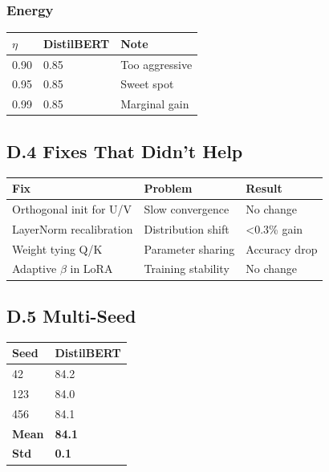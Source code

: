 \subsubsection{Energy}

\begin{table}[H]
\centering
\small
\begin{tabular}{lll}
\toprule
\textbf{$\eta$} & \textbf{DistilBERT} & \textbf{Note} \\
\midrule
0.90 & 0.85 & Too aggressive \\
0.95 & 0.85 & Sweet spot \\
0.99 & 0.85 & Marginal gain \\
\bottomrule
\end{tabular}
\end{table}

\subsection{D.4 Fixes That Didn't Help}

\begin{table}[H]
\centering
\small
\begin{tabular}{lll}
\toprule
\textbf{Fix} & \textbf{Problem} & \textbf{Result} \\
\midrule
Orthogonal init for U/V & Slow convergence & No change \\
LayerNorm recalibration & Distribution shift & \textless{}0.3\% gain \\
Weight tying Q/K & Parameter sharing & Accuracy drop \\
Adaptive $\beta$ in LoRA & Training stability & No change \\
\bottomrule
\end{tabular}
\end{table}

\subsection{D.5 Multi-Seed}

\begin{table}[H]
\centering
\small
\begin{tabular}{ll}
\toprule
\textbf{Seed} & \textbf{DistilBERT} \\
\midrule
42 & 84.2 \\
123 & 84.0 \\
456 & 84.1 \\
\textbf{Mean} & \textbf{84.1} \\
\textbf{Std} & \textbf{0.1} \\
\bottomrule
\end{tabular}
\end{table}

